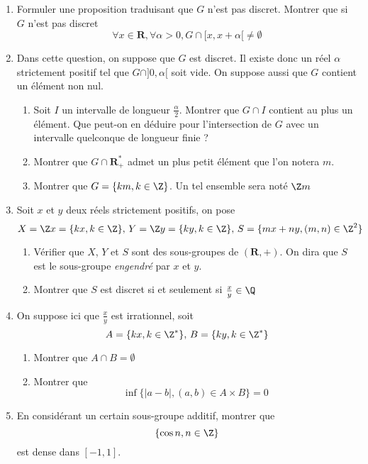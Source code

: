 \documentclass[11pt,a4paper,fleqn]{article}
\begin{document}
\begin{enumerate}
  \item Formuler une proposition traduisant que $G$ n'est pas discret. Montrer que si $G$ n'est pas discret
  \[\forall x \in \mathbf{R} , \forall \alpha >0 , G\cap [x,x+\alpha[ \neq \emptyset\]
  \item Dans cette question, on suppose que $G$ est discret. Il existe donc un r{\'e}el $\alpha$ strictement positif tel que $G\cap ]0,\alpha[$ soit vide. On suppose aussi que $G$ contient un {\'e}l{\'e}ment non nul.
    \begin{enumerate}
      \item Soit $I$ un intervalle de longueur $\frac{\alpha}{2}$. Montrer que $G\cap I$ contient au plus un {\'e}l{\'e}ment. Que peut-on en d{\'e}duire pour l'intersection de $G$ avec un intervalle quelconque de longueur finie ?
      \item Montrer que $G\cap\mathbf{R_+^*}$ admet un plus petit {\'e}l{\'e}ment que l'on notera $m$.
      \item Montrer que $G=\{km,k\in\Z\}$. Un tel ensemble sera not{\'e} $\Z m$
    \end{enumerate}

  \item Soit $x$ et $y$ deux r{\'e}els strictement positifs, on pose
  \[X=\Z x=\{kx,k \in \Z\},\, Y=\Z y=\{ky,k\in \Z\},\, S=\{mx+ny,(m,n)\in\Z^2\}\]
     \begin{enumerate}
       \item V{\'e}rifier que $X$, $Y$ et $S$ sont des sous-groupes de $(\mathbf{R},+)$. On dira que $S$ est le sous-groupe
       \emph{engendr{\'e}} par $x$ et $y$.
       \item Montrer que $S$ est discret si et seulement si $\frac{x}{y}\in \Q$
     \end{enumerate}

  \item On suppose ici que $\frac{x}{y}$ est irrationnel, soit\[A=\{kx,k \in \Z^*\},\, B=\{ky,k \in \Z^*\}\]
     \begin{enumerate}
       \item Montrer que $A\cap B=\emptyset$
       \item  Montrer que
       \[\inf\{|a-b|,(a,b)\in A \times B\}=0\]
     \end{enumerate}

  \item En consid{\'e}rant un certain sous-groupe additif, montrer que
  \[\{ \cos n , n\in \Z\}\]
  est dense dans $[-1,1]$.

\end{enumerate}
\end{document}
